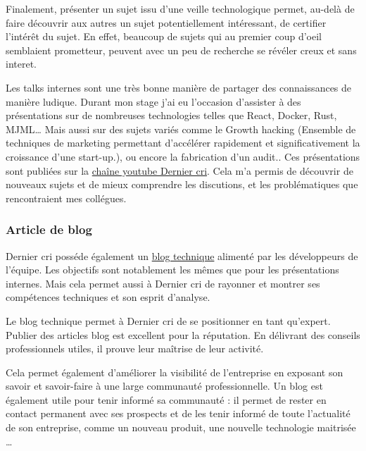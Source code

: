 \documentclass[12pt,a4paper]{article}
\begin{document}
  \bigskip

  Finalement, présenter un sujet issu d'une veille technologique permet,
  au-delà de faire découvrir aux autres un sujet potentiellement
  intéressant, de certifier l'intérêt du sujet. En effet, beaucoup de
  sujets qui au premier coup d'oeil semblaient prometteur, peuvent avec un
  peu de recherche se révéler creux et sans interet.

  \bigskip

  Les talks internes sont une très bonne manière de partager des
  connaissances de manière ludique. Durant mon stage j'ai eu l'occasion
  d'assister à des présentations sur de nombreuses technologies telles que
  React, Docker, Rust, MJML\ldots{} Mais aussi sur des sujets variés comme
  le Growth hacking (Ensemble de techniques de marketing permettant
  d'accélérer rapidement et significativement la croissance d'une
  start-up.), ou encore la fabrication d'un audit.. Ces présentations sont
  publiées sur la
  \href{https://www.youtube.com/channel/UCDfdBlzldhg_PEu3xZTPsHg}{chaîne
  youtube Dernier cri}. Cela m'a permis de découvrir de nouveaux sujets et
  de mieux comprendre les discutions, et les problématiques que
  rencontraient mes collégues.

  \bigskip

  \subsubsection{Article de blog}\label{article-de-blog}

  \bigskip

  Dernier cri posséde également un
  \href{http://derniercri.io/tech-blog}{blog technique} alimenté par les
  développeurs de l'équipe. Les objectifs sont notablement les mêmes que
  pour les présentations internes. Mais cela permet aussi à Dernier cri de
  rayonner et montrer ses compétences techniques et son esprit d'analyse.

  \bigskip

  Le blog technique permet à Dernier cri de se positionner en tant
  qu'expert. Publier des articles blog est excellent pour la réputation.
  En délivrant des conseils professionnels utiles, il prouve leur maîtrise
  de leur activité.

  \bigskip

  Cela permet également d'améliorer la visibilité de l'entreprise en
  exposant son savoir et savoir-faire à une large communauté
  professionnelle. Un blog est également utile pour tenir informé sa
  communauté : il permet de rester en contact permanent avec ses prospects
  et de les tenir informé de toute l'actualité de son entreprise, comme un
  nouveau produit, une nouvelle technologie maitrisée \ldots{}
\end{document}
